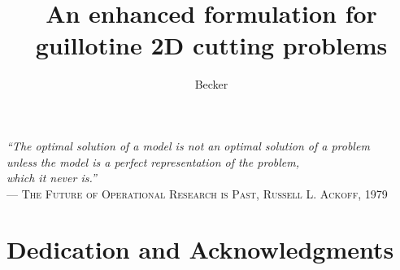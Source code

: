 \documentclass[ppgc,tese,english,formais,babel]{iiufrgs}
\title{An enhanced formulation for guillotine 2D cutting problems
}
\author{Becker}{Henrique}
\begin{document}
\maketitle

\clearpage
\begin{flushright}
\mbox{}\vfill
{\sffamily\itshape
``The optimal solution of a model is not an optimal solution of a problem\\
unless the model is a perfect representation of the problem,\\
which it never is.''\\}
--- \textsc{The Future of Operational Research is Past, Russell L. Ackoff, 1979}
\end{flushright}

\chapter*{Dedication and Acknowledgments}
\end{document}
